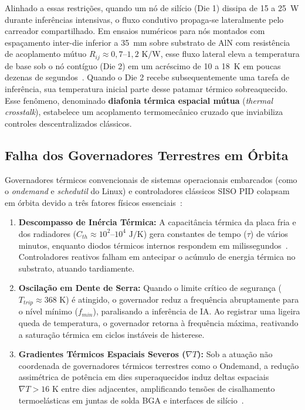 \documentclass[journal]{IEEEtran}
\begin{document}
Alinhado a essas restrições, quando um nó de silício (Die 1) dissipa de 15 a 25~W durante inferências intensivas, o fluxo condutivo propaga-se lateralmente pelo carreador compartilhado. Em ensaios numéricos para nós montados com espaçamento inter-die inferior a 35~mm sobre substrato de AlN com resistência de acoplamento mútuo $R_{ij} \approx 0{,}7\text{--}1{,}2\text{ K/W}$, esse fluxo lateral eleva a temperatura de base sob o nó contíguo (Die 2) em um acréscimo de 10 a 18~K em poucas dezenas de segundos~\cite{chen2026hotai, wang2025packaging}. Quando o Die 2 recebe subsequentemente uma tarefa de inferência, sua temperatura inicial parte desse patamar térmico sobreaquecido. Esse fenômeno, denominado \textbf{diafonia térmica espacial mútua} (\textit{thermal crosstalk}), estabelece um acoplamento termomecânico cruzado que inviabiliza controles descentralizados clássicos.

\subsection{Falha dos Governadores Terrestres em Órbita}
Governadores térmicos convencionais de sistemas operacionais embarcados (como o \textit{ondemand} e \textit{schedutil} do Linux) e controladores clássicos SISO PID colapsam em órbita devido a três fatores físicos essenciais~\cite{brooks2001dtm, skadron2004hotspot, hoffmann2021online}:
\begin{enumerate}
    \item \textbf{Descompasso de Inércia Térmica:} A capacitância térmica da placa fria e dos radiadores ($C_{th} \approx 10^2\text{--}10^4\text{ J/K}$) gera constantes de tempo ($\tau$) de vários minutos, enquanto diodos térmicos internos respondem em milissegundos~\cite{skadron2004hotspot}. Controladores reativos falham em antecipar o acúmulo de energia térmica no substrato, atuando tardiamente.
    \item \textbf{Oscilação em Dente de Serra:} Quando o limite crítico de segurança ($T_{trip} \approx 368\text{ K}$) é atingido, o governador reduz a frequência abruptamente para o nível mínimo ($f_{min}$), paralisando a inferência de IA. Ao registrar uma ligeira queda de temperatura, o governador retorna à frequência máxima, reativando a saturação térmica em ciclos instáveis de histerese.
    \item \textbf{Gradientes Térmicos Espaciais Severos ($\nabla T$):} Sob a atuação não coordenada de governadores térmicos terrestres como o Ondemand, a redução assimétrica de potência em dies superaquecidos induz deltas espaciais $\nabla T > 16\text{ K}$ entre dies adjacentes, amplificando tensões de cisalhamento termoelásticas em juntas de solda BGA e interfaces de silício~\cite{manson1966fatigue, ecss2008thermal}.
\end{enumerate}
\end{document}
